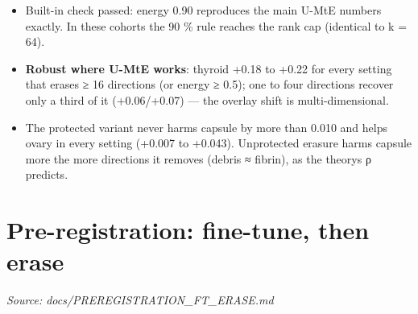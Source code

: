 {\begin{itemize}

\item
  Built-in check passed: energy 0.90 reproduces the main U-MtE numbers exactly. In these cohorts the 90 \% rule reaches
  the rank cap (identical to k = 64).
\item
  \textbf{Robust where U-MtE works}: thyroid +0.18 to +0.22 for every setting that erases ≥ 16 directions (or energy ≥ 0.5);
  one to four directions recover only a third of it (+0.06/+0.07) --- the overlay shift is multi-dimensional.
\item
  The protected variant never harms capsule by more than 0.010 and helps ovary in every setting (+0.007 to +0.043).
  Unprotected erasure harms capsule more the more directions it removes (debris ≈ fibrin), as the theory\textquotesingle s ρ predicts.
\end{itemize}

}

\section{Pre-registration: fine-tune, then erase}\label{doc:PREREGISTRATION_FT_ERASE}
\noindent\textit{Source: docs/PREREGISTRATION\_FT\_ERASE.md}

